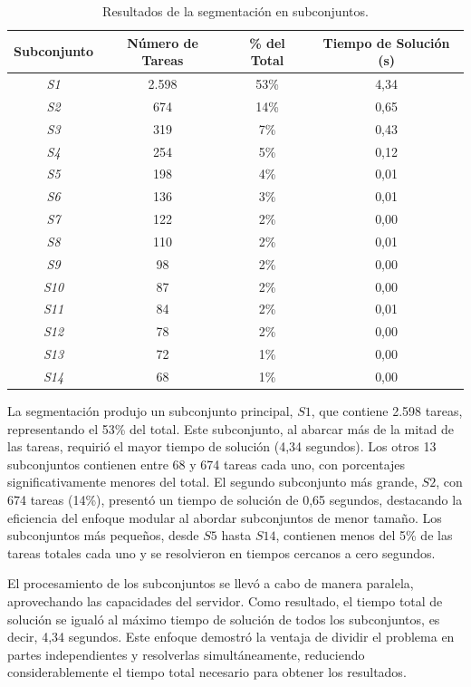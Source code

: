\documentclass{article}
\begin{document}
\begin{table}[htbp]
    \centering
    \begin{tabular}{cccc}
        \toprule
        \textbf{Subconjunto} & \textbf{Número de Tareas} & \textbf{\% del Total} & \textbf{Tiempo de Solución (s)} \\
        \midrule
        \textit{S1} & 2.598 & 53\% & 4,34 \\
        \textit{S2} & 674 & 14\% & 0,65 \\
        \textit{S3} & 319 & 7\% & 0,43 \\
        \textit{S4} & 254 & 5\% & 0,12 \\
        \textit{S5} & 198 & 4\% & 0,01 \\
        \textit{S6} & 136 & 3\% & 0,01 \\
        \textit{S7} & 122 & 2\% & 0,00 \\
        \textit{S8} & 110 & 2\% & 0,01 \\
        \textit{S9} & 98 & 2\% & 0,00 \\
        \textit{S10} & 87 & 2\% & 0,00 \\
        \textit{S11} & 84 & 2\% & 0,01 \\
        \textit{S12} & 78 & 2\% & 0,00 \\
        \textit{S13} & 72 & 1\% & 0,00 \\
        \textit{S14} & 68 & 1\% & 0,00 \\
        \bottomrule
    \end{tabular}
    \caption{Resultados de la segmentación en subconjuntos.}
    \label{tab:subsets_results}
\end{table}


La segmentación produjo un subconjunto principal, \( S1 \), que contiene 2.598 tareas, representando el 53\% del total. Este subconjunto, al abarcar más de la mitad de las tareas, requirió el mayor tiempo de solución (4,34 segundos). Los otros 13 subconjuntos contienen entre 68 y 674 tareas cada uno, con porcentajes significativamente menores del total. El segundo subconjunto más grande, \( S2 \), con 674 tareas (14\%), presentó un tiempo de solución de 0,65 segundos, destacando la eficiencia del enfoque modular al abordar subconjuntos de menor tamaño. Los subconjuntos más pequeños, desde \( S5 \) hasta \( S14 \), contienen menos del 5\% de las tareas totales cada uno y se resolvieron en tiempos cercanos a cero segundos.

El procesamiento de los subconjuntos se llevó a cabo de manera paralela, aprovechando las capacidades del servidor. Como resultado, el tiempo total de solución se igualó al máximo tiempo de solución de todos los subconjuntos, es decir, 4,34 segundos. Este enfoque demostró la ventaja de dividir el problema en partes independientes y resolverlas simultáneamente, reduciendo considerablemente el tiempo total necesario para obtener los resultados.
\end{document}
